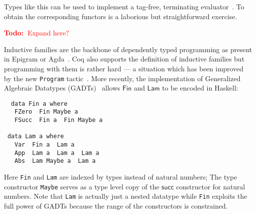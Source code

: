 \documentclass[a4paper]{article}
\newcommand{\todo}[1]{\textcolor{red}{\textbf{Todo:~}#1}}
\newcommand{\Conid}[1]{\mathit{#1}}
\newcommand{\Varid}[1]{\mathit{#1}}
\def\resethooks{%
  \global\let\SaveRestoreHook\empty
  \global\let\ColumnHook\empty}
\newcommand{\hsindent}[1]{\quad}%
\renewcommand\Varid[1]{\mathord{\textsf{#1}}}
\let\Conid\Varid
\begin{document}
\resethooks

\noindent
Types like this can be used to implement a tag-free, terminating
evaluator~\cite{bsn}. To obtain the corresponding functors
is a laborious but straightforward exercise.

\todo{Expand here?}

\noindent
Inductive families are the backbone of
dependently typed programming as present in Epigram or
Agda~\cite{Agda}. Coq also supports the definition of inductive families
but programming with them is rather hard --- a situation which has been
improved by the new \texttt{Program} tactic~\cite{sozeau}. 
More recently, the implementation of Generalized Algebraic Datatypes 
(GADTs)~\cite{Hinze:GADT} 
allows \ensuremath{\Conid{Fin}} and \ensuremath{\Conid{Lam}} to be encoded in Haskell:
\begin{tabbing}\tt
~data~Fin~a~where~\\
\tt ~~~FZero~~Fin~Maybe~a\\
\tt ~~~FSucc~~Fin~a~~Fin~Maybe~a\\
\tt ~\\
\tt ~data~Lam~a~where~\\
\tt ~~~Var~~Fin~a~~Lam~a\\
\tt ~~~App~~Lam~a~~Lam~a~~Lam~a\\
\tt ~~~Abs~~Lam~Maybe~a~~Lam~a
\end{tabbing}
Here \texttt{Fin} and \texttt{Lam} are indexed by types instead of
natural numbers; The type constructor \texttt{Maybe} serves as a type level
copy of the \ensuremath{\Varid{succ}} constructor for natural numbers.
Note that \texttt{Lam} is actually just a nested datatype 
\cite{alti:csl99} while \texttt{Fin} exploits the full power of
GADTs because the range of the constructors is constrained.
\end{document}
